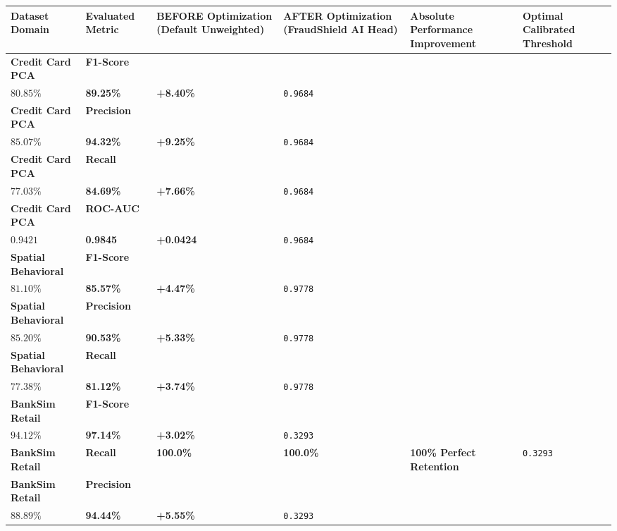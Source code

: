 \documentclass[12pt,a4paper,oneside]{report}
\begin{document}
\begin{table}[H]
\centering
\footnotesize
\begin{adjustbox}{width=\textwidth,center}
\begin{tabular}{| l | l | l | l | l | l |}
\hline
\rowcolor{tableheader} \textbf{Dataset Domain} & \textbf{Evaluated Metric} & \textbf{BEFORE Optimization (Default Unweighted)} & \textbf{AFTER Optimization (FraudShield AI Head)} & \textbf{Absolute Performance Improvement} & \textbf{Optimal Calibrated Threshold} \\ \hline
\textbf{Credit Card PCA} & \textbf{F1-Score} & \\$80.85\%$ & \textbf{89.25\%} & \textbf{+8.40\%} & \texttt{0.9684} \\ \hline
\rowcolor{tablealt} \textbf{Credit Card PCA} & \textbf{Precision} & \\$85.07\%$ & \textbf{94.32\%} & \textbf{+9.25\%} & \texttt{0.9684} \\ \hline
\textbf{Credit Card PCA} & \textbf{Recall} & \\$77.03\%$ & \textbf{84.69\%} & \textbf{+7.66\%} & \texttt{0.9684} \\ \hline
\rowcolor{tablealt} \textbf{Credit Card PCA} & \textbf{ROC-AUC} & \\$0.9421$ & \textbf{0.9845} & \textbf{+0.0424} & \texttt{0.9684} \\ \hline
\textbf{Spatial Behavioral} & \textbf{F1-Score} & \\$81.10\%$ & \textbf{85.57\%} & \textbf{+4.47\%} & \texttt{0.9778} \\ \hline
\rowcolor{tablealt} \textbf{Spatial Behavioral} & \textbf{Precision} & \\$85.20\%$ & \textbf{90.53\%} & \textbf{+5.33\%} & \texttt{0.9778} \\ \hline
\textbf{Spatial Behavioral} & \textbf{Recall} & \\$77.38\%$ & \textbf{81.12\%} & \textbf{+3.74\%} & \texttt{0.9778} \\ \hline
\rowcolor{tablealt} \textbf{BankSim Retail} & \textbf{F1-Score} & \\$94.12\%$ & \textbf{97.14\%} & \textbf{+3.02\%} & \texttt{0.3293} \\ \hline
\textbf{BankSim Retail} & \textbf{Recall} & \textbf{100.0\%} & \textbf{100.0\%} & \textbf{100\% Perfect Retention} & \texttt{0.3293} \\ \hline
\rowcolor{tablealt} \textbf{BankSim Retail} & \textbf{Precision} & \\$88.89\%$ & \textbf{94.44\%} & \textbf{+5.55\%} & \texttt{0.3293} \\ \hline

\end{tabular}
\end{adjustbox}
\end{table}
\end{document}
